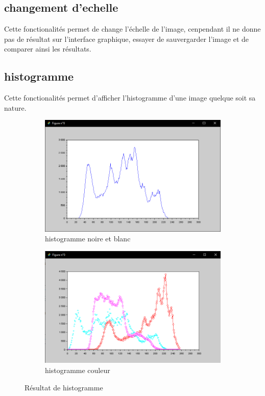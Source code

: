 \documentclass[12pt, letterpaper]{article}
\begin{document}
\subsection{changement d'echelle}
Cette fonctionalités permet de change l'échelle de l'image, cenpendant il ne donne pas de résultat sur l'interface graphique,
essayer de sauvergarder l'image et de comparer ainsi les résultats.

\subsection{histogramme}
Cette fonctionalités permet d'afficher l'histogramme d'une image quelque soit sa nature.
\begin{figure}[h!]
    \centering
    \begin{subfigure}[b]{1\linewidth}
      \includegraphics[width=\linewidth]{img/fig15.PNG}
      \caption{histogramme noire et blanc}
    \end{subfigure}
    \begin{subfigure}[b]{1\linewidth} 
      \includegraphics[width=\linewidth]{img/fig16.PNG}
      \caption{histogramme couleur}
    \end{subfigure}
    \caption{Résultat de histogramme}
    \label{fig:histo}
\end{figure}
\end{document}
